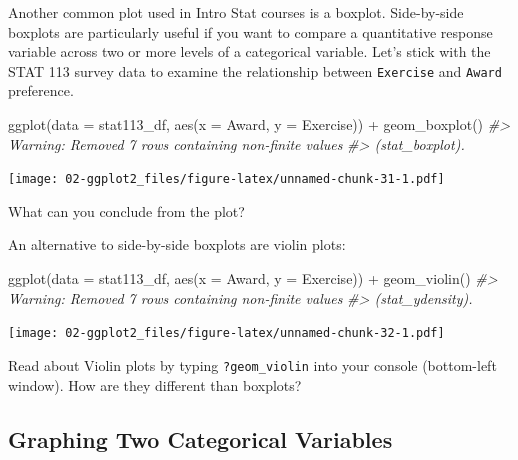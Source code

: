 \documentclass[
]{book}
\newenvironment{Shaded}{\begin{snugshade}}{\end{snugshade}}
\newcommand{\AttributeTok}[1]{\textcolor[rgb]{0.77,0.63,0.00}{#1}}
\newcommand{\CommentTok}[1]{\textcolor[rgb]{0.56,0.35,0.01}{\textit{#1}}}
\newcommand{\FunctionTok}[1]{\textcolor[rgb]{0.00,0.00,0.00}{#1}}
\newcommand{\NormalTok}[1]{#1}
\newcommand{\SpecialCharTok}[1]{\textcolor[rgb]{0.00,0.00,0.00}{#1}}
\begin{document}
Another common plot used in Intro Stat courses is a boxplot. Side-by-side boxplots are particularly useful if you want to compare a quantitative response variable across two or more levels of a categorical variable. Let's stick with the STAT 113 survey data to examine the relationship between \texttt{Exercise} and \texttt{Award} preference.

\begin{Shaded}
\begin{Highlighting}[]
\FunctionTok{ggplot}\NormalTok{(}\AttributeTok{data =}\NormalTok{ stat113\_df, }\FunctionTok{aes}\NormalTok{(}\AttributeTok{x =}\NormalTok{ Award, }\AttributeTok{y =}\NormalTok{ Exercise)) }\SpecialCharTok{+}
  \FunctionTok{geom\_boxplot}\NormalTok{()}
\CommentTok{\#\textgreater{} Warning: Removed 7 rows containing non{-}finite values}
\CommentTok{\#\textgreater{} (stat\_boxplot).}
\end{Highlighting}
\end{Shaded}

\texttt{[image: 02-ggplot2\_files/figure-latex/unnamed-chunk-31-1.pdf]}

What can you conclude from the plot?

An alternative to side-by-side boxplots are violin plots:

\begin{Shaded}
\begin{Highlighting}[]
\FunctionTok{ggplot}\NormalTok{(}\AttributeTok{data =}\NormalTok{ stat113\_df, }\FunctionTok{aes}\NormalTok{(}\AttributeTok{x =}\NormalTok{ Award, }\AttributeTok{y =}\NormalTok{ Exercise)) }\SpecialCharTok{+}
  \FunctionTok{geom\_violin}\NormalTok{()}
\CommentTok{\#\textgreater{} Warning: Removed 7 rows containing non{-}finite values}
\CommentTok{\#\textgreater{} (stat\_ydensity).}
\end{Highlighting}
\end{Shaded}

\texttt{[image: 02-ggplot2\_files/figure-latex/unnamed-chunk-32-1.pdf]}

Read about Violin plots by typing \texttt{?geom\_violin} into your console (bottom-left window). How are they different than boxplots?

\hypertarget{graphing-two-categorical-variables}{%
\subsection{Graphing Two Categorical Variables}\label{graphing-two-categorical-variables}}
\end{document}
